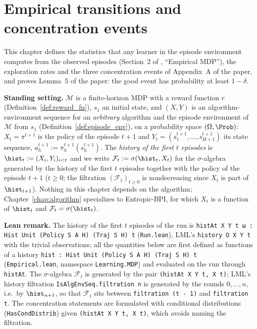 \chapter{Empirical transitions and concentration events}
\label{chap:empirical}

This chapter defines the statistics that any learner in the episode environment computes from
the observed episodes (Section~2 of \cite{essakine2026tight}, ``Empirical MDP''), the
exploration rates and the three concentration events of Appendix~A of the paper, and proves
Lemma~5 of the paper: the good event has probability at least $1 - \delta$.

\textbf{Standing setting.} $\mathcal M$ is a finite-horizon MDP with a reward function $r$
(Definition~\ref{def:reward_fn}), $s_1$ an initial state, and $(X, Y)$ is an
algorithm-environment sequence for an \emph{arbitrary} algorithm and the episode environment of
$\mathcal M$ from $s_1$ (Definition~\ref{def:episode_env}), on a probability space
$(\Omega, \Prob)$: $X_t = \pi^{t+1}$ is the policy of the episode $t + 1$ and
$Y_t = (s^{t+1}_1, \dots, s^{t+1}_{H+1})$ its state sequence, $a^{t+1}_h := \pi^{t+1}_h(s^{t+1}_h)$.
The \emph{history of the first $t$ episodes} is $\hist_t := (X_i, Y_i)_{i < t}$ and we write
$\mathcal F_t := \sigma(\hist_t, X_t)$ for the $\sigma$-algebra generated by the history of the
first $t$ episodes together with the policy of the episode $t + 1$ ($t \ge 0$; the filtration
$(\mathcal F_t)_{t \ge 0}$ is nondecreasing since $X_t$ is part of $\hist_{t+1}$). Nothing in this
chapter depends on the algorithm; Chapter~\ref{chap:algorithm} specializes to Entropic-BPI,
for which $X_t$ is a function of $\hist_t$ and $\mathcal F_t = \sigma(\hist_t)$.

\textbf{Lean remark.} The history of the first $t$ episodes of the run is
\texttt{histAt X Y t ω : Hist Unit (Policy S A H) (Traj S H) t} (\texttt{Run.lean}), LML's
\texttt{history O X Y t} with the trivial observations; all the quantities below are first
defined as functions of a history \texttt{hist : Hist Unit (Policy S A H) (Traj S H) t}
(\texttt{Empirical.lean}, namespace \texttt{Learning.MDP}) and evaluated on the run through
\texttt{histAt}. The $\sigma$-algebra $\mathcal F_t$ is generated by the pair
\texttt{(histAt X Y t, X t)}; LML's history filtration \texttt{IsAlgEnvSeq.filtration n} is
generated by the rounds $0, \dots, n$, i.e.\ by $\hist_{n+1}$, so that $\mathcal F_t$ sits between
\texttt{filtration (t - 1)} and \texttt{filtration t}. The concentration statements are
formulated with conditional distributions (\texttt{HasCondDistrib}) given
\texttt{(histAt X Y t, X t)}, which avoids naming the filtration.

